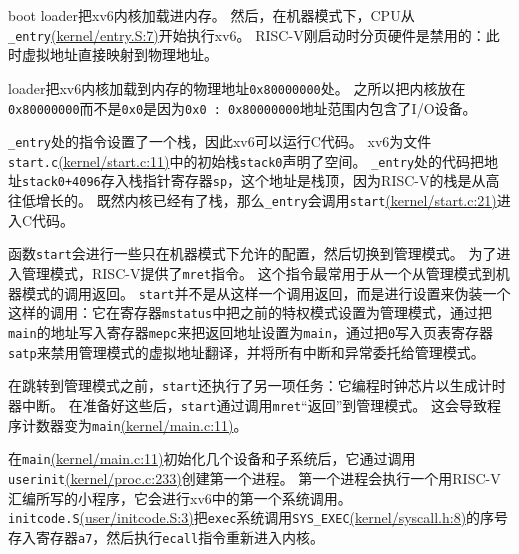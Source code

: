 boot loader把xv6内核加载进内存。
然后，在机器模式下，CPU从\texttt{\_entry}\href{https://github.com/mit-pdos/xv6-riscv/blob/riscv/kernel/entry.S#L7}{(kernel/entry.S:7)}开始执行xv6。
RISC-V刚启动时分页硬件是禁用的：此时虚拟地址直接映射到物理地址。

loader把xv6内核加载到内存的物理地址\texttt{0x80000000}处。
之所以把内核放在\texttt{0x80000000}而不是\texttt{0x0}是因为\texttt{0x0 : 0x80000000}地址范围内包含了I/O设备。

\texttt{\_entry}处的指令设置了一个栈，因此xv6可以运行C代码。
xv6为文件\texttt{start.c}\href{https://github.com/mit-pdos/xv6-riscv/blob/riscv/kernel/start.c#L11}{(kernel/start.c:11)}中的初始栈\texttt{stack0}声明了空间。
\texttt{\_entry}处的代码把地址\texttt{stack0+4096}存入栈指针寄存器\texttt{sp}，这个地址是栈顶，因为RISC-V的栈是从高往低增长的。
既然内核已经有了栈，那么\texttt{\_entry}会调用\texttt{start}\href{https://github.com/mit-pdos/xv6-riscv/blob/riscv/kernel/start.c#L21}{(kernel/start.c:21)}进入C代码。

函数\texttt{start}会进行一些只在机器模式下允许的配置，然后切换到管理模式。
为了进入管理模式，RISC-V提供了\texttt{mret}指令。
这个指令最常用于从一个从管理模式到机器模式的调用返回。
\texttt{start}并不是从这样一个调用返回，而是进行设置来伪装一个这样的调用：它在寄存器\texttt{mstatus}中把之前的特权模式设置为管理模式，通过把\texttt{main}的地址写入寄存器\texttt{mepc}来把返回地址设置为\texttt{main}，通过把\texttt{0}写入页表寄存器\texttt{satp}来禁用管理模式的虚拟地址翻译，并将所有中断和异常委托给管理模式。

在跳转到管理模式之前，\texttt{start}还执行了另一项任务：它编程时钟芯片以生成计时器中断。
在准备好这些后，\texttt{start}通过调用\texttt{mret}“返回”到管理模式。
这会导致程序计数器变为\texttt{main}\href{https://github.com/mit-pdos/xv6-riscv/blob/risc/kernel/main.c#L11}{(kernel/main.c:11)}。

在\texttt{main}\href{https://github.com/mit-pdos/xv6-riscv/blob/risc/kernel/main.c#L11}{(kernel/main.c:11)}初始化几个设备和子系统后，它通过调用\texttt{userinit}\href{https://github.com/mit-pdos/xv6-riscv/blob/risc/kernel/proc.c#L233}{(kernel/proc.c:233)}创建第一个进程。
第一个进程会执行一个用RISC-V汇编所写的小程序，它会进行xv6中的第一个系统调用。
\texttt{initcode.S}\href{https://github.com/mit-pdos/xv6-riscv/blob/risc/user/initcode.S#L3}{(user/initcode.S:3)}把\texttt{exec}系统调用\texttt{SYS\_EXEC}\href{https://github.com/mit-pdos/xv6-riscv/blob/risc/kernel/syscall.h#L8}{(kernel/syscall.h:8)}的序号存入寄存器\texttt{a7}，然后执行\texttt{ecall}指令重新进入内核。

